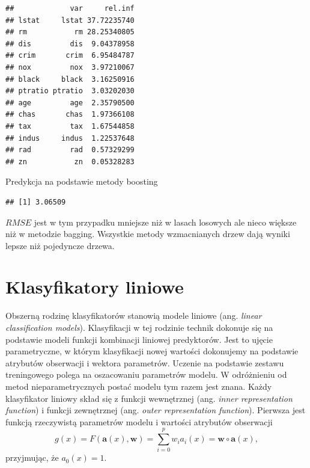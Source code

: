 \documentclass[]{book}
\newenvironment{Shaded}{\begin{snugshade}}{\end{snugshade}}
\newcommand{\DataTypeTok}[1]{\textcolor[rgb]{0.13,0.29,0.53}{#1}}
\newcommand{\DecValTok}[1]{\textcolor[rgb]{0.00,0.00,0.81}{#1}}
\newcommand{\KeywordTok}[1]{\textcolor[rgb]{0.13,0.29,0.53}{\textbf{#1}}}
\newcommand{\NormalTok}[1]{#1}
\newcommand{\OperatorTok}[1]{\textcolor[rgb]{0.81,0.36,0.00}{\textbf{#1}}}
\newcommand{\StringTok}[1]{\textcolor[rgb]{0.31,0.60,0.02}{#1}}
\theoremstyle{plain}
\theoremstyle{definition}
\theoremstyle{definition}
\theoremstyle{definition}
\theoremstyle{definition}
\theoremstyle{remark}
\begin{document}
\begin{verbatim}
##             var     rel.inf
## lstat     lstat 37.72235740
## rm           rm 28.25340805
## dis         dis  9.04378958
## crim       crim  6.95484787
## nox         nox  3.97210067
## black     black  3.16250916
## ptratio ptratio  3.03202030
## age         age  2.35790500
## chas       chas  1.97366108
## tax         tax  1.67544858
## indus     indus  1.22537648
## rad         rad  0.57329299
## zn           zn  0.05328283
\end{verbatim}

Predykcja na podstawie metody boosting

\begin{Shaded}
\end{Shaded}

\begin{verbatim}
## [1] 3.06509
\end{verbatim}

\(RMSE\) jest w tym przypadku mniejsze niż w lasach losowych ale nieco większe niż w metodzie bagging. Wszystkie metody wzmacnianych drzew dają wyniki lepsze niż pojedyncze drzewa.

\hypertarget{klasyfikatory-liniowe}{%
\chapter{Klasyfikatory liniowe}\label{klasyfikatory-liniowe}}

Obszerną rodzinę klasyfikatorów stanowią modele liniowe (ang. \emph{linear classification models}). Klasyfikacji w tej rodzinie technik dokonuje się na podstawie modeli funkcji kombinacji liniowej predyktorów. Jest to ujęcie parametryczne, w którym klasyfikacji nowej wartości dokonujemy na podstawie atrybutów obserwacji i wektora parametrów. Uczenie na podstawie zestawu treningowego polega na oszacowaniu parametrów modelu. W odróżnieniu od metod nieparametrycznych postać modelu tym razem jest znana. Każdy klasyfikator liniowy skład się z funkcji wewnętrznej (ang. \emph{inner representation function}) i funkcji zewnętrznej (ang. \emph{outer representation function}).
Pierwsza jest funkcją rzeczywistą parametrów modelu i wartości atrybutów obserwacji
\begin{equation}
    g(x) = F(\mathbf{a}(x),\mathbf{w})=\sum_{i=0}^pw_ia_i(x)=\mathbf{w}\circ \mathbf{a}(x),
\end{equation}
przyjmując, że \(a_0(x)=1\).
\end{document}
